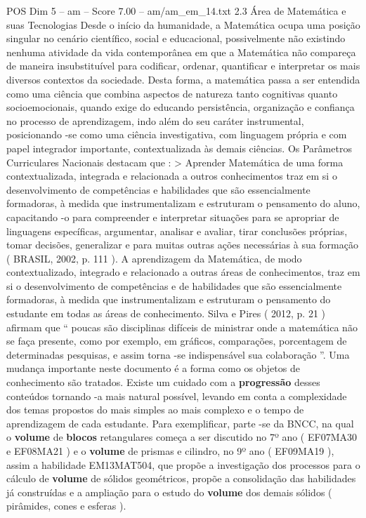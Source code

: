 \begin{textsample}{POS Dim 5 – am – Score 7.00 – am/am\_em\_14.txt}  \label{ex:f5_pos_070}
2.3 Área de Matemática e suas Tecnologias Desde o início da humanidade, a Matemática ocupa uma posição singular no cenário científico, social e educacional, possivelmente não existindo nenhuma atividade da vida contemporânea em que a Matemática não compareça de maneira insubstituível para codificar, ordenar, quantificar e interpretar os mais diversos contextos da sociedade.
Desta forma, a matemática passa a ser entendida como uma ciência que combina aspectos de natureza tanto cognitivas quanto socioemocionais, quando exige do educando persistência, organização e confiança no processo de aprendizagem, indo além do seu caráter instrumental, posicionando -se como uma ciência investigativa, com linguagem própria e com papel integrador importante, contextualizada às demais ciências.
Os Parâmetros Curriculares Nacionais destacam que : > Aprender Matemática de uma forma contextualizada, integrada e relacionada a outros conhecimentos traz em si o desenvolvimento de competências e habilidades que são essencialmente formadoras, à medida que instrumentalizam e estruturam o pensamento do aluno, capacitando -o para compreender e interpretar situações para se apropriar de linguagens específicas, argumentar, analisar e avaliar, tirar conclusões próprias, tomar decisões, generalizar e para muitas outras ações necessárias à sua formação ( BRASIL, 2002, p. 111 ).
A aprendizagem da Matemática, de modo contextualizado, integrado e relacionado a outras áreas de conhecimentos, traz em si o desenvolvimento de competências e de habilidades que são essencialmente formadoras, à medida que instrumentalizam e estruturam o pensamento do estudante em todas as áreas de conhecimento.
Silva e Pires ( 2012, p. 21 ) afirmam que “ poucas são disciplinas difíceis de ministrar onde a matemática não se faça presente, como por exemplo, em gráficos, comparações, porcentagem de determinadas pesquisas, e assim torna -se indispensável sua colaboração ”.
Uma mudança importante neste documento é a forma como os objetos de conhecimento são tratados.
Existe um cuidado com a \textbf{progressão} desses conteúdos tornando -a mais natural possível, levando em conta a complexidade dos temas propostos do mais simples ao mais complexo e o tempo de aprendizagem de cada estudante.
Para exemplificar, parte -se da BNCC, na qual o \textbf{volume} de \textbf{blocos} retangulares começa a ser discutido no 7º ano ( EF07MA30 e EF08MA21 ) e o \textbf{volume} de prismas e cilindro, no 9º ano ( EF09MA19 ), assim a habilidade EM13MAT504, que propõe a investigação dos processos para o cálculo de \textbf{volume} de sólidos geométricos, propõe a consolidação das habilidades já construídas e a ampliação para o estudo do \textbf{volume} dos demais sólidos ( pirâmides, cones e esferas ).

\end{textsample}
